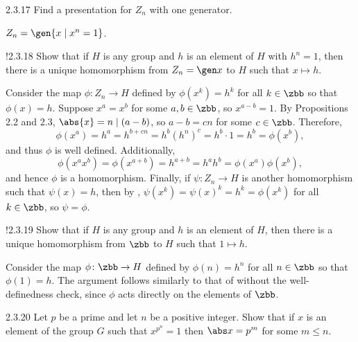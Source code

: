 \begin{exercise}{2.3.17}
    Find a presentation for $Z_n$ with one generator.
\end{exercise}

\begin{sol}
    $Z_n = \gen{x \mid x^n = 1}$.
\end{sol}

\begin{exercise}!{2.3.18}
    Show that if $H$ is any group and $h$ is an element of $H$ with $h^n = 1$, then there is a unique homomorphism from $Z_n = \gen x$ to $H$ such that $x \mapsto h$.
\end{exercise}

\begin{sol}
    Consider the map $\phi \colon Z_n \to H$ defined by $\phi(x^k) = h^k$ for all $k \in \zbb$ so that $\phi(x) = h$.
    Suppose $x^a = x^b$ for some $a, b \in \zbb$, so $x^{a - b} = 1$.
    By Propositions 2.2 and 2.3, $\abs{x} = n \mid (a - b)$, so $a - b = cn$ for some $c \in \zbb$.
    Therefore,
    \[
        \phi(x^a) = h^a = h^{b + cn} = h^b (h^n)^c = h^b \cdot 1 = h^b = \phi(x^b),
    \]
    and thus $\phi$ is well defined.
    Additionally,
    \[
        \phi(x^a x^b) = \phi(x^{a + b}) = h^{a + b} = h^a h^b = \phi(x^a) \phi(x^b),
    \]
    and hence $\phi$ is a homomorphism.
    Finally, if $\psi \colon Z_n \to H$ is another homomorphism such that $\psi(x) = h$, then by , $\psi(x^k) = \psi(x)^k = h^k = \phi(x^k)$ for all $k \in \zbb$, so $\psi = \phi$.
\end{sol}

\begin{exercise}!{2.3.19}
    Show that if $H$ is any group and $h$ is an element of $H$, then there is a unique homomorphism from $\zbb$ to $H$ such that $1 \mapsto h$.
\end{exercise}

\begin{sol}
    Consider the map $\phi \colon \zbb \to H$ defined by $\phi(n) = h^n$ for all $n \in \zbb$ so that $\phi(1) = h$.
    The argument follows similarly to that of  without the well-definedness check, since $\phi$ acts directly on the elements of $\zbb$.
\end{sol}

\begin{exercise}{2.3.20}
    Let $p$ be a prime and let $n$ be a positive integer.
	Show that if $x$ is an element of the group $G$ such that $x^{p^n} = 1$ then $\abs x = p^m$ for some $m \leq n$.
\end{exercise}

